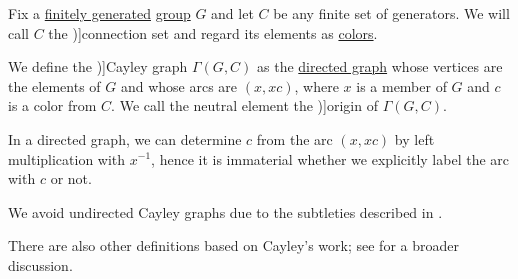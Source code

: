 \begin{definition}\label{def:cayley_graph}\mimprovised
  Fix a  \hyperref[def:group_presentation]{finitely generated} \hyperref[def:group]{group} \( G \) and let \( C \) be any finite set of generators. We will call \( C \) the \term[en=connection set (\cite[def. 7.3.1]{Knauer2019AlgebraicGraphTheory})]{connection set} and regard its elements as \hyperref[def:set_coloring]{colors}.

  We define the \term[en=Cayley graph (\cite[def. 2.1.3]{HadelerMüller2017CellularAutomata})]{Cayley graph} \( \Gamma(G, C) \) as the \hyperref[def:directed_graph]{directed graph} whose vertices are the elements of \( G \) and whose arcs are \( (x, xc) \), where \( x \) is a member of \( G \) and \( c \) is a color from \( C \). We call the neutral element the \term[en=origin (\cite[def. 2.1.3]{HadelerMüller2017CellularAutomata})]{origin} of \( \Gamma(G, C) \).
\end{definition}
\begin{comments}
  \item In a directed graph, we can determine \( c \) from the arc \( (x, xc) \) by left multiplication with \( x^{-1} \), hence it is immaterial whether we explicitly label the arc with \( c \) or not.

  \item We avoid undirected Cayley graphs due to the subtleties described in .

  \item There are also other definitions based on Cayley's work; see  for a broader discussion.
\end{comments}


